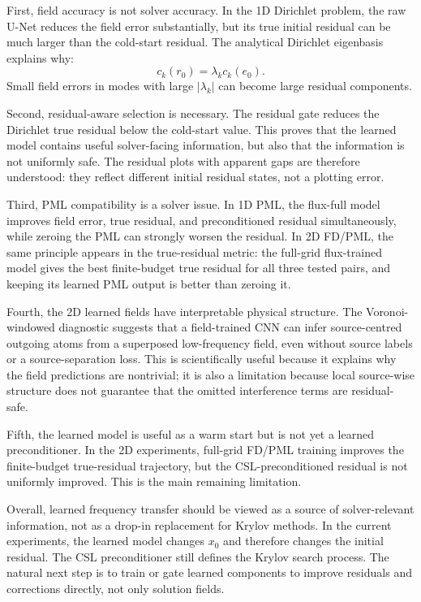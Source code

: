 First, field accuracy is not solver accuracy. In the 1D Dirichlet problem, the
raw U-Net reduces the field error substantially, but its true initial residual
can be much larger than the cold-start residual. The analytical Dirichlet
eigenbasis explains why:
\[
    c_k(r_0)=\lambda_k c_k(e_0).
\]
Small field errors in modes with large $|\lambda_k|$ can become large
residual components.

Second, residual-aware selection is necessary. The residual gate reduces the
Dirichlet true residual below the cold-start value. This proves that the
learned model contains useful solver-facing information, but also that the
information is not uniformly safe. The residual plots with apparent gaps are
therefore understood: they reflect different initial residual states, not a
plotting error.

Third, PML compatibility is a solver issue. In 1D PML, the flux-full model
improves field error, true residual, and preconditioned residual
simultaneously, while zeroing the PML can strongly worsen the residual. In 2D
FD/PML, the same principle appears in the true-residual metric: the full-grid
flux-trained model gives the best finite-budget true residual for all three
tested pairs, and keeping its learned PML output is better than zeroing it.

Fourth, the 2D learned fields have interpretable physical structure. The
Voronoi-windowed diagnostic suggests that a field-trained CNN can infer
source-centred outgoing atoms from a superposed low-frequency field, even
without source labels or a source-separation loss. This is scientifically
useful because it explains why the field predictions are nontrivial; it is
also a limitation because local source-wise structure does not guarantee that
the omitted interference terms are residual-safe.

Fifth, the learned model is useful as a warm start but is not yet a learned
preconditioner. In the 2D experiments, full-grid FD/PML training improves the
finite-budget true-residual trajectory, but the CSL-preconditioned residual is
not uniformly improved. This is the main remaining limitation.

Overall, learned frequency transfer should be viewed as a source of
solver-relevant information, not as a drop-in replacement for Krylov methods.
In the current experiments, the learned model changes $x_0$ and therefore
changes the initial residual. The CSL preconditioner still defines the Krylov
search process. The natural next step is to train or gate learned components
to improve residuals and corrections directly, not only solution fields.
